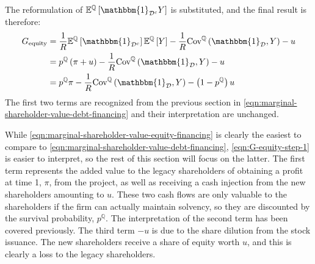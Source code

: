 \documentclass[../main.tex]{subfiles}
\begin{document}
        The reformulation of $\mathbb{E}^{\mathbb{Q}}\left[\mathbbm{1}_{\mathcal{D}^{c}} Y\right]$ is substituted, 
        and the final result is therefore:
            \begin{align}
                G_{\text{equity}} &=
                    \discountfactor
                    \mathbb{E}^{\mathbb{Q}}\left[\mathbbm{1}_{\mathcal{D}^{c}}\right]
                    \mathbb{E}^{\mathbb{Q}}\left[Y\right]
                    -
                    \discountfactor
                    \text{Cov}^{\mathbb{Q}}\left(
                        \mathbbm{1}_{\mathcal{D}},
                        Y
                    \right)
                    -
                    u
                    \nonumber \\
                &= 
                    p^{\mathbb{Q}}
                    \left(
                        \pi
                        +
                        u
                    \right)
                    -
                    \discountfactor
                    \text{Cov}^{\mathbb{Q}}\left(
                        \mathbbm{1}_{\mathcal{D}},
                        Y
                    \right)
                    -
                    u 
                    \label{eqn:G-equity-step-1} \\
                &= 
                    p^{\mathbb{Q}}
                    \pi
                    -
                    \discountfactor
                    \text{Cov}^{\mathbb{Q}}\left(
                        \mathbbm{1}_{\mathcal{D}},
                        Y
                    \right)
                    -
                    \left(
                        1
                        -
                        p^{\mathbb{Q}}
                    \right)
                    u 
                \label{eqn:marginal-shareholder-value-equity-financing}
            \end{align}
        The first two terms are recognized from the previous section in 
        \cref{eqn:marginal-shareholder-value-debt-financing}
        and their interpretation are unchanged. 

        While \cref{eqn:marginal-shareholder-value-equity-financing} is clearly the easiest to compare to 
        \cref{eqn:marginal-shareholder-value-debt-financing},
        \cref{eqn:G-equity-step-1} is easier to interpret, so the rest of this section will focus on the latter.
        The first term represents the added value to the legacy shareholders of 
        obtaining a profit at time 1, $\pi$, from the project,
        as well as receiving a cash injection from the new shareholders amounting to $u$.
        These two cash flows are only valuable to the shareholders if the firm can actually maintain solvency,
        so they are discounted by the survival probability, $p^{\mathbb{Q}}$.
        The interpretation of the second term has been covered previously.
        The third term $-u$ is due to the share dilution from the stock issuance.
        The new shareholders receive a share of equity worth $u$, 
        and this is clearly a loss to the legacy shareholders.
\end{document}
